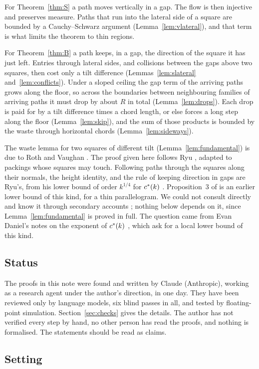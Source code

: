 For Theorem~\ref{thm:S} a path moves vertically in a gap. The flow is then injective and preserves measure. Paths that run into the lateral side of a square are bounded by a Cauchy--Schwarz argument (Lemma~\ref{lem:vlateral}), and that term is what limits the theorem to thin regions.

For Theorem~\ref{thm:B} a path keeps, in a gap, the direction of the square it has just left. Entries through lateral sides, and collisions between the gaps above two squares, then cost only a tilt difference (Lemmas~\ref{lem:slateral} and~\ref{lem:conflicts}). Under a sloped ceiling the gap term of the arriving paths grows along the floor, so across the boundaries between neighbouring families of arriving paths it must drop by about $R$ in total (Lemma~\ref{lem:drops}). Each drop is paid for by a tilt difference times a chord length, or else forces a long step along the floor (Lemma~\ref{lem:skip}), and the sum of those products is bounded by the waste through horizontal chords (Lemma~\ref{lem:sideways}).

The waste lemma for two squares of different tilt (Lemma~\ref{lem:fundamental}) is due to Roth and Vaughan \cite{RV78}. The proof given here follows Ryu \cite[Proposition~3.3]{Ryu26b}, adapted to packings whose squares may touch. Following paths through the squares along their normals, the height identity, and the rule of keeping direction in gaps are Ryu's, from his lower bound of order $k^{1/4}$ for $c^{*}(k)$ \cite{Ryu26b}. Proposition~3 of \cite{Bui25} is an earlier lower bound of this kind, for a thin parallelogram. We could not consult \cite{RV78} directly and know it through secondary accounts \cite{Dan26c}; nothing below depends on it, since Lemma~\ref{lem:fundamental} is proved in full. The question came from Evan Daniel's notes on the exponent of $c^{*}(k)$ \cite{Dan26c}, which ask for a local lower bound of this kind.

\subsection*{Status}
The proofs in this note were found and written by Claude (Anthropic), working as a research agent under the author's direction, in one day. They have been reviewed only by language models, six blind passes in all, and tested by floating-point simulation. Section~\ref{sec:checks} gives the details. The author has not verified every step by hand, no other person has read the proofs, and nothing is formalised. The statements should be read as claims.

\subsection*{Setting}
